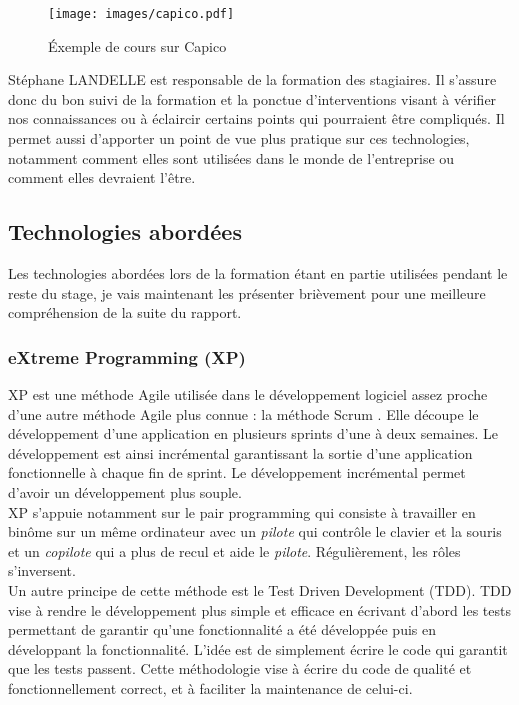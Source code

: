 \begin{figure}[H]
	\centering
	\texttt{[image: images/capico.pdf]}
	\caption{Éxemple de cours sur Capico}
\end{figure}

Stéphane LANDELLE est responsable de la formation des stagiaires. Il s'assure donc du bon suivi de la formation et la ponctue d'interventions visant à vérifier nos connaissances ou à éclaircir certains points qui pourraient être compliqués. Il permet aussi d'apporter un point de vue plus pratique sur ces technologies, notamment comment elles sont utilisées dans le monde de l'entreprise ou comment elles devraient l'être.

\subsection{Technologies abordées}

Les technologies abordées lors de la formation étant en partie utilisées pendant le reste du stage, je vais maintenant les présenter brièvement pour une meilleure compréhension de la suite du rapport.

\subsubsection{eXtreme Programming (XP)}

XP est une méthode Agile utilisée dans le développement logiciel assez proche d'une autre méthode Agile plus connue : la méthode Scrum \cite{scrum}. Elle découpe le développement d'une application en plusieurs sprints d'une à deux semaines. Le développement est ainsi incrémental garantissant la sortie d'une application fonctionnelle à chaque fin de sprint. Le développement incrémental permet d'avoir un développement plus souple.\\

XP s'appuie notamment sur le pair programming qui consiste à travailler en binôme sur un même ordinateur avec un \emph{pilote} qui contrôle le clavier et la souris et un \emph{copilote} qui a plus de recul et aide le \emph{pilote}. Régulièrement, les rôles s'inversent.\\

Un autre principe de cette méthode est le Test Driven Development (TDD). TDD vise à rendre le développement plus simple et efficace en écrivant d'abord les tests permettant de garantir qu'une fonctionnalité a été développée puis en développant la fonctionnalité. L'idée est de simplement écrire le code qui garantit que les tests passent. Cette méthodologie vise à écrire du code de qualité et fonctionnellement correct, et à faciliter la maintenance de celui-ci. 

